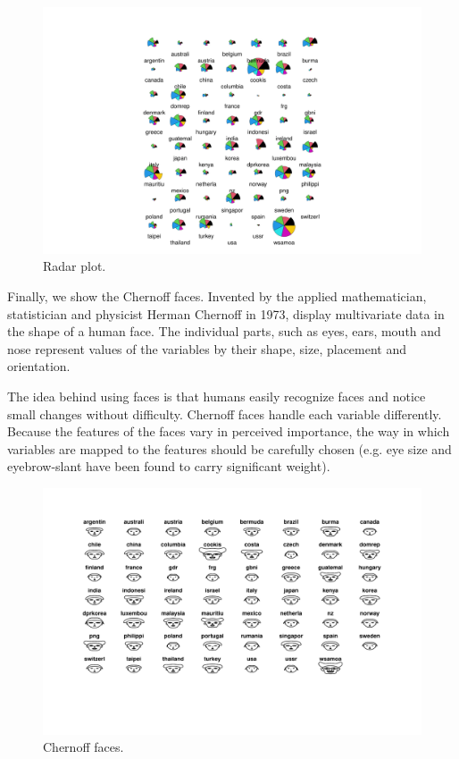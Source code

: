 \documentclass[a4paper]{article}
\newcommand{\highspace}{\vspace{1.2em}\noindent}
\begin{document}
    \begin{figure}[!htp]
        \centering
        \includegraphics[width=\textwidth]{img/visualization-of-multivariate-data-5.pdf}
        \caption*{Radar plot.}
    \end{figure}

    \newpage

    \noindent
    Finally, we show the Chernoff faces. Invented by the applied mathematician, statistician and physicist Herman Chernoff in 1973, display multivariate data in the shape of a human face. The individual parts, such as eyes, ears, mouth and nose represent values of the variables by their shape, size, placement and orientation. 
    
    \highspace
    The idea behind using faces is that humans easily recognize faces and notice small changes without difficulty. Chernoff faces handle each variable differently. Because the features of the faces vary in perceived importance, the way in which variables are mapped to the features should be carefully chosen (e.g. eye size and eyebrow-slant have been found to carry significant weight).\cite{morris2000experimental}
    
    \begin{figure}[!htp]
        \centering
        \includegraphics[width=\textwidth]{img/visualization-of-multivariate-data-6.pdf}
        \caption*{Chernoff faces.}
    \end{figure}
\end{document}
